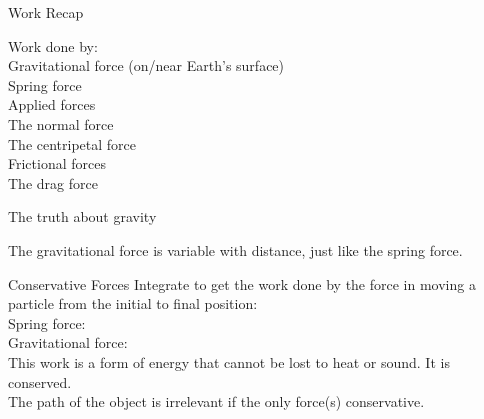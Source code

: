 \begin{frame}{Work Recap}

\small
Work done by:\\[2ex]
Gravitational force (on/near Earth's surface)\\[2ex]
Spring force \\[2ex]
Applied forces\\[2ex]
The normal force\\[2ex]
The centripetal force\\[2ex]
Frictional forces\\[2ex]
The drag force\\[2ex]



\vspace{10cm}
\end{frame}


\begin{frame}{The truth about gravity}
\small

\vspace{10cm}
The gravitational force is variable with distance, just like the spring force.\\


\end{frame}


\begin{frame}{Conservative Forces}
\small
Integrate to get the work done by the force in moving a particle from the initial to final position:\\[1ex]
Spring force: \\[8ex]
Gravitational force: \\[8ex]


This work is a form of energy that cannot be lost to heat or sound. It is conserved.\\
The path of the object is irrelevant if the only force(s) conservative.\\


\end{frame}

